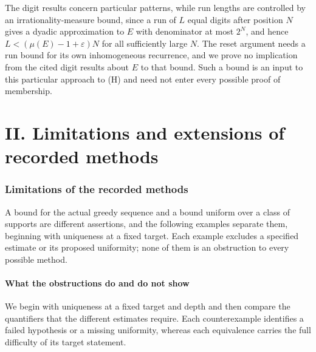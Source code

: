 The digit results concern particular patterns, while run lengths are
controlled by an irrationality-measure bound, since a run of $L$ equal
digits after position $N$ gives a dyadic approximation to $E$ with
denominator at most $2^N$, and hence $L<(\mu(E)-1+\varepsilon)N$ for all
sufficiently large $N$. The reset argument needs a run bound for its own
inhomogeneous recurrence, and we prove no implication from the cited
digit results about $E$ to that bound. Such a bound is an input to this
particular approach to (H) and need not enter every possible proof of
membership.

\clearpage
\part*{II. Limitations and extensions of recorded methods}
\section{Limitations of the recorded methods}
\label{sec:257-wall}
A bound for the actual greedy sequence and a bound uniform over a class
of supports are different assertions, and the following examples
separate them, beginning with uniqueness at a fixed target. Each example
excludes a specified estimate or its proposed uniformity; none of them
is an obstruction to every possible method.


\subsection{What the obstructions do and do not show}

We begin with uniqueness at a fixed target and depth and then compare
the quantifiers that the different estimates require. Each
counterexample identifies a failed hypothesis or a missing uniformity,
whereas each equivalence carries the full difficulty of its target
statement.

